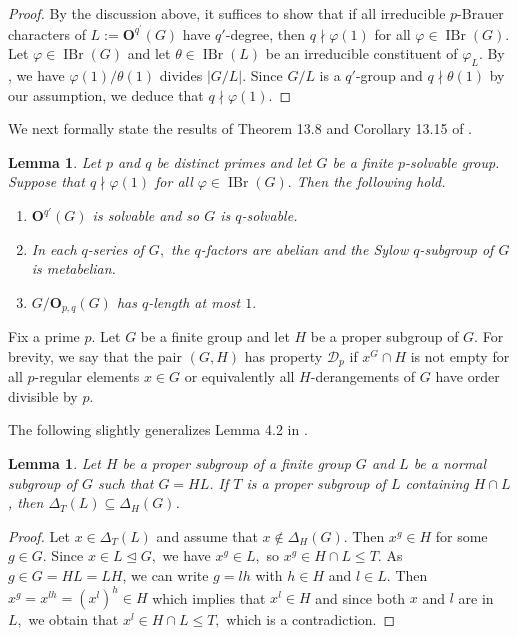 \documentclass[12pt]{amsart}
\newtheorem{lemma}[theorem]{Lemma}
\theoremstyle{remark}
\numberwithin{equation}{section}
\begin{document}
\begin{proof} By the discussion above, it suffices to show that  if all irreducible $p$-Brauer characters of $L:={\mathbf{O}}^{q^\prime}(G)$ have $q'$-degree, then $q\nmid \varphi(1)$ for all $\varphi\in\operatorname{IBr}(G)$. Let $\varphi\in\operatorname{IBr}(G)$ and let $\theta\in\operatorname{IBr}(L)$ be an irreducible constituent of $\varphi_L.$ By \cite[Theorem~8.30]{Navarro}, we have ${\varphi(1)}/{\theta(1)}$ divides $|G/L|.$ Since $G/L$ is a $q'$-group and $q\nmid \theta(1)$ by our assumption, we deduce that $q\nmid \varphi(1).$
\end{proof}

We next formally state the results of Theorem 13.8 and Corollary 13.15 of \cite{MW2}.

\begin{lemma}\label{lem2} Let $p$ and $q$ be distinct primes and let $G$ be a finite $p$-solvable group. Suppose that $q\nmid \varphi(1)$ for all $\varphi\in\operatorname{IBr}(G).$ Then the following hold.

\begin{enumerate}
\item ${\mathbf{O}}^{q'}(G)$ is solvable and so $G$ is $q$-solvable.
\item In each $q$-series of $G,$ the $q$-factors are abelian and the Sylow $q$-subgroup of $G$ is metabelian.
\item $G/{\mathbf{O}}_{p,q}(G)$ has $q$-length at most $1.$
\end{enumerate}

\end{lemma}

Fix a prime $p$. Let $G$ be a finite group and let $H$ be a proper subgroup of $G.$ For brevity, we say that the pair $(G,H)$ has property $\mathcal{D}_p$ if $x^G\cap H$ is not empty for all $p$-regular elements $x\in G$ or equivalently all $H$-derangements of $G$ have order divisible by $p.$

The following slightly generalizes Lemma 4.2 in \cite{BT}.

\begin{lemma}\label{lem:normal}
Let $H$ be a  proper subgroup of a finite group $G$ and $L$ be a normal subgroup of $G$ such that $G=HL$.  If $T$ is a proper subgroup of $L$ containing $H\cap L$,
then $\Delta_T(L)\subseteq \Delta_H(G)$.
\end{lemma}

\begin{proof}
Let $x\in \Delta_T(L)$ and assume that $x\not\in\Delta_H(G)$. Then  $x^{g}\in H$ for some $g\in G.$ Since $x\in L\unlhd G,$ we  have $x^{g}\in L,$ so $x^{g}\in H\cap L\le T.$  As $g\in G=HL=LH$, we can write $g=lh$ with $h\in H$ and $l\in L.$ Then $x^g=x^{lh}=(x^l)^h\in H$ which implies that $x^l\in H$ and since both $x$ and $l$ are in $L,$ we obtain that $x^l\in H\cap L\le T,$ which is a contradiction.
\end{proof}
\end{document}
